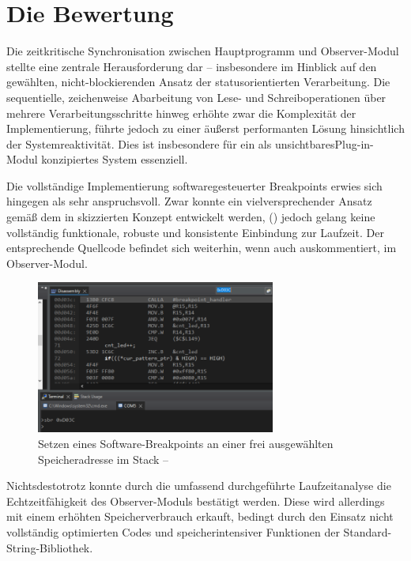 
\newpage
\section{Die Bewertung}
\label{sec:Bewertung}
Die zeitkritische Synchronisation zwischen Hauptprogramm und Observer-Modul stellte eine zentrale Herausforderung dar -- insbesondere im Hinblick auf den gew\"ahlten, nicht-blockierenden Ansatz der statusorientierten Verarbeitung. Die sequentielle, zeichenweise Abarbeitung von Lese- und Schreiboperationen \"uber mehrere Verarbeitungsschritte hinweg erh\"ohte zwar die Komplexit\"at der Implementierung, f\"uhrte jedoch zu einer \"au{\ss}erst performanten L\"osung hinsichtlich der Systemreaktivit\"at. Dies ist insbesondere f\"ur ein als \grqq unsichtbares\grqq Plug-in-Modul konzipiertes System essenziell.

Die vollst\"andige Implementierung softwaregesteuerter Breakpoints erwies sich hingegen als sehr anspruchsvoll. Zwar konnte ein vielversprechender Ansatz gem\"a{\ss} dem in  skizzierten Konzept entwickelt werden, (\Vgl {}) jedoch gelang keine vollst\"andig funktionale, robuste und konsistente Einbindung zur Laufzeit. Der entsprechende Quellcode befindet sich weiterhin, wenn auch auskommentiert, im Observer-Modul.

\begin{figure}[h!]
	\centering
	\includegraphics[width=0.7\textwidth]{../Bilder/ObserverModule/set_breakpoint.png}
	\caption{Setzen eines Software-Breakpoints an einer frei ausgew\"ahlten Speicheradresse im Stack -- }
	\label{fig:software_breakpoint}
\end{figure}

Nichtsdestotrotz konnte durch die umfassend durchgef\"uhrte Laufzeitanalyse die Echtzeitf\"ahigkeit des Observer-Moduls best\"atigt werden. Diese wird allerdings mit einem erh\"ohten Speicherverbrauch erkauft, bedingt durch den Einsatz nicht vollst\"andig optimierten Codes und speicherintensiver Funktionen der Standard-String-Bibliothek.

